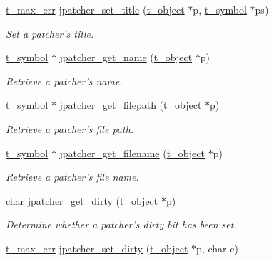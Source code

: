 \begin{DoxyCompactItemize}
\hyperlink{group__datatypes_ga73edaae82b318855cc09fac994918165}{t\_\-max\_\-err} \hyperlink{group__jpatcher_gadd59390cab86f13282704e8bdf4ea3ba}{jpatcher\_\-set\_\-title} (\hyperlink{structt__object}{t\_\-object} $\ast$p, \hyperlink{structt__symbol}{t\_\-symbol} $\ast$ps)
\begin{DoxyCompactList}\small\item\em Set a patcher's title. \item\end{DoxyCompactList}\item 
\hyperlink{structt__symbol}{t\_\-symbol} $\ast$ \hyperlink{group__jpatcher_ga245a38ac7814605e198466313884a246}{jpatcher\_\-get\_\-name} (\hyperlink{structt__object}{t\_\-object} $\ast$p)
\begin{DoxyCompactList}\small\item\em Retrieve a patcher's name. \item\end{DoxyCompactList}\item 
\hyperlink{structt__symbol}{t\_\-symbol} $\ast$ \hyperlink{group__jpatcher_gac278d621dc1eef9e3b0dbddfc6bf3f53}{jpatcher\_\-get\_\-filepath} (\hyperlink{structt__object}{t\_\-object} $\ast$p)
\begin{DoxyCompactList}\small\item\em Retrieve a patcher's file path. \item\end{DoxyCompactList}\item 
\hyperlink{structt__symbol}{t\_\-symbol} $\ast$ \hyperlink{group__jpatcher_gaf8d1fda60ecc028f2aff88c81e8d4b4f}{jpatcher\_\-get\_\-filename} (\hyperlink{structt__object}{t\_\-object} $\ast$p)
\begin{DoxyCompactList}\small\item\em Retrieve a patcher's file name. \item\end{DoxyCompactList}\item 
char \hyperlink{group__jpatcher_ga5eb01f66882115ca01028ca68c4307b3}{jpatcher\_\-get\_\-dirty} (\hyperlink{structt__object}{t\_\-object} $\ast$p)
\begin{DoxyCompactList}\small\item\em Determine whether a patcher's dirty bit has been set. \item\end{DoxyCompactList}\item 
\hyperlink{group__datatypes_ga73edaae82b318855cc09fac994918165}{t\_\-max\_\-err} \hyperlink{group__jpatcher_gaad586555902f02618e3c3fa1f977d5a5}{jpatcher\_\-set\_\-dirty} (\hyperlink{structt__object}{t\_\-object} $\ast$p, char c)

\end{DoxyCompactItemize}
